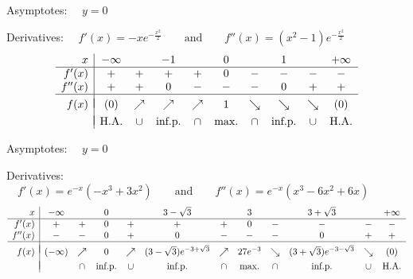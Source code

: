 \begin{Answer}
    	
    	\Question Asymptotes: $\quad y=0$\par
    		Derivatives: $\quad f'(x)=-x e^{-\frac{x^2}{2}}\qquad\mbox{and}\qquad f''(x)=\left(x^2-1\right)e^{-\frac{x^2}{2}}$
    		\[ \begin{array}{r|ccccccccc}
    		x & -\infty & & -1 &  & 0 &  & 1 & &+\infty \\
    		\hline
    		f'(x)   & + & + & + & + & 0 & - & - & - & - \\
    		f''(x)  & + & + & 0 & - & - & - & 0 & + & + \\
    		\hline
    		&&&&&&&&&\vspace{-0.3cm}\\
    		f(x)    & (0) & \nearrow & \nearrow & \nearrow & 1 & \searrow & \searrow & \searrow & (0)\\
    		&&&&&&&&&\vspace{-0.3cm}\\                                                                              
    		& \mbox{H.A.} & \cup & \mbox{inf.p.} & \cap & \mbox{max.} & \cap & \mbox{inf.p.} & \cup & \mbox{H.A.} \\
    		\end{array}\]
    		
    		\ifcalculus 
    		\Question Asymptotes: $\quad y=0$\par
    		Derivatives: $\quad f'(x)=e^{-x}\left(-x^3+3x^2\right)\qquad\mbox{and}\qquad f''(x)=e^{-x}\left(x^3-6x^2+6x\right)$
    		\[ \begin{array}{r|ccccccccccc}
    		x & -\infty & & 0 & & 3-\sqrt{3} &  & 3 & & 3+\sqrt{3} &  &+\infty \\
    		\hline
    		f'(x) & +  & + & 0 & + & + & + & 0 & - & - & - & - \\
    		f''(x) & -  & - & 0 & + & 0 & - & - & - & 0 & + & + \\
    		\hline
    		&&&&&&&&&&&\vspace{-0.3cm}\\
    		f(x)    & (-\infty) & \nearrow & 0 & \nearrow & (3-\sqrt{3})e^{-3+\sqrt{3}} & \nearrow & 27e^{-3} & \searrow & (3+\sqrt{3})e^{-3-\sqrt{3}} & \searrow & (0)\\
    		&&&&&&&&&&&\vspace{-0.3cm}\\                                                                              
    		&  & \cap & \mbox{inf.p.} & \cup & \mbox{inf.p.} & \cap  & \mbox{max.} & \cap &  \mbox{inf.p.} & \cup & \mbox{H.A.} \\
    		\end{array}\]
    		\fi
    		

\end{Answer}
